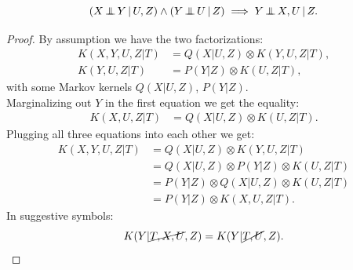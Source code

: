 \begin{Lem}
    \[ (X \operatorname*{\perp\mkern-11mu\perp}  Y \operatorname*{|} U , Z) \land (Y \operatorname*{\perp\mkern-11mu\perp}  U \operatorname*{|} Z) \implies Y \operatorname*{\perp\mkern-11mu\perp}  X , U \operatorname*{|} Z.\]
\begin{proof}
 By assumption we have the two factorizations:
    \begin{align*}
        K(X,Y,U,Z|T) & = Q(X|U,Z) \otimes K(Y,U,Z|T),\\
        K(Y,U,Z|T) & = P(Y|Z) \otimes K(U,Z|T),
    \end{align*}
     with some Markov kernels $Q(X|U,Z)$, $P(Y|Z)$.\\
     Marginalizing out $Y$ in the first equation we get the equality:
    \begin{align*}
        K(X,U,Z|T) & = Q(X|U,Z) \otimes K(U,Z|T).
    \end{align*}
Plugging all three equations into each other we get:
    \begin{align*}
        K(X,Y,U,Z|T) & = Q(X|U,Z) \otimes K(Y,U,Z|T)\\
                     & = Q(X|U,Z) \otimes  P(Y|Z) \otimes K(U,Z|T)\\
                     & = P(Y|Z) \otimes  Q(X|U,Z)   \otimes K(U,Z|T) \\
                     & =  P(Y|Z)  \otimes   K(X,U,Z|T).
    \end{align*}
In suggestive symbols:
\[ K(Y|\cancel{T,X,U},Z) = K(Y|\cancel{T,U},Z). \]
\end{proof}
\end{Lem}

